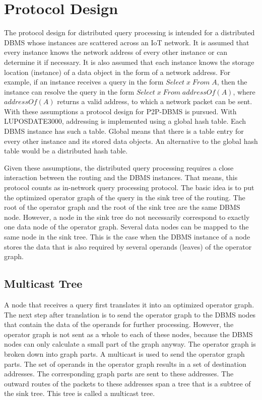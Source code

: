 \documentclass[english,version-2019-11]{uzl-thesis}
\begin{document}
\section{Protocol Design}
The protocol design for distributed query processing is intended for a distributed DBMS whose instances are scattered across an IoT network. It is assumed that every instance knows the network address of every other instance or can determine it if necessary. It is also assumed that each instance knows the storage location (instance) of a data object in the form of a network address.
For example, if an instance receives a query in the form $Select\; x\; From\; A$, then the instance can resolve the query in the form $Select\; x\; From\; addressOf(A)$, where $addressOf(A)$ returns a valid address, to which a network packet can be sent. With these assumptions a protocol design for P2P-DBMS is pursued. With LUPOSDATE3000, addressing is implemented using a global hash table. Each DBMS instance has such a table. Global means that there is a table entry for every other instance and its stored data objects. An alternative to the global hash table would be a distributed hash table.

Given these assumptions, the distributed query processing requires a close interaction between the routing and the DBMS instances. That means, this protocol counts as in-network query processing protocol. The basic idea is to put the optimized operator graph of the query in the sink tree of the routing. The root of the operator graph and the root of the sink tree are the same DBMS node. However, a node in the sink tree do not necessarily correspond to exactly one data node of the operator graph. Several data nodes can be mapped to the same node in the sink tree. This is the case when the DBMS instance of a node stores the data that is also required by several operands (leaves) of the operator graph.

\subsection{Multicast Tree}
A node that receives a query first translates it into an optimized operator graph. The next step after translation is to send the operator graph to the DBMS nodes that contain the data of the operands for further processing. However, the operator graph is not sent as a whole to each of these nodes, because the DBMS nodes can only calculate a small part of the graph anyway. The operator graph is broken down into graph parts. A multicast is used to send the operator graph parts. The set of operands in the operator graph results in a set of destination addresses. The corresponding graph parts are sent to these addresses. The outward routes of the packets to these addresses span a tree that is a subtree of the sink tree. This tree is called a multicast tree.
\end{document}

